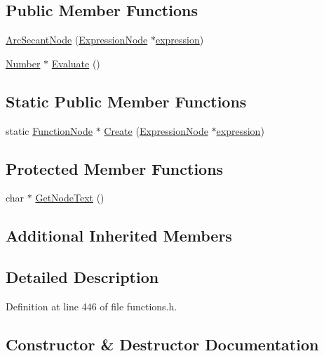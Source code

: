 \subsection*{Public Member Functions}
\begin{DoxyCompactItemize}
\item 
\hyperlink{classArcSecantNode_af52359509f3d178954501b477ff1db5e}{Arc\+Secant\+Node} (\hyperlink{classExpressionNode}{Expression\+Node} $\ast$\hyperlink{classFunctionNode_ad7577b179a1937aaf8a0058bb5b546dc}{expression})
\item 
\hyperlink{structNumber}{Number} $\ast$ \hyperlink{classArcSecantNode_a4440babc181bf1763a0dca583ad5adbb}{Evaluate} ()
\end{DoxyCompactItemize}
\subsection*{Static Public Member Functions}
\begin{DoxyCompactItemize}
\item 
static \hyperlink{classFunctionNode}{Function\+Node} $\ast$ \hyperlink{classArcSecantNode_abe48bdd0e47a2dd5e5478f551f20c357}{Create} (\hyperlink{classExpressionNode}{Expression\+Node} $\ast$\hyperlink{classFunctionNode_ad7577b179a1937aaf8a0058bb5b546dc}{expression})
\end{DoxyCompactItemize}
\subsection*{Protected Member Functions}
\begin{DoxyCompactItemize}
\item 
char $\ast$ \hyperlink{classArcSecantNode_a75e25b2005cd24caf6b374a662df9975}{Get\+Node\+Text} ()
\end{DoxyCompactItemize}
\subsection*{Additional Inherited Members}


\subsection{Detailed Description}


Definition at line 446 of file functions.\+h.



\subsection{Constructor \& Destructor Documentation}
